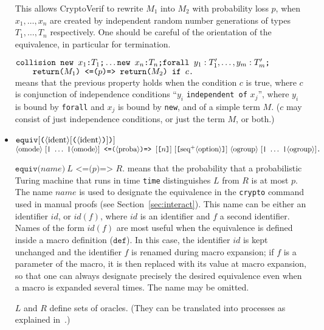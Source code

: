 \begin{itemize}
This allows CryptoVerif to rewrite $M_1$ into $M_2$ with probability
loss $p$, when $x_1, \ldots, x_n$ are created by independent random
number generations of types $T_1, \ldots, T_n$ respectively. One
should be careful of the orientation of the equivalence, in particular
for termination.

$\texttt{collision }\texttt{new\ }{x_1}\texttt{:}{T_1}\texttt{;}\ldots 
\texttt{new\ }{x_n}\texttt{:}{T_n}\texttt{;}
\texttt{forall }y_1:T'_1, \ldots, y_m:T'_m\texttt{;}$\\
$\null\qquad \texttt{return(}M_1\texttt{) <=(}p\texttt{)=> return(}M_2\texttt{) if $c$.}$\\
means that the previous property holds when the condition $c$ is true, where
$c$ is conjunction of independence conditions ``$y_i$ \texttt{independent of} $x_j$'',
where $y_i$ is bound by  \texttt{forall} and $x_j$ is bound by \texttt{new},
and of a simple term $M$. ($c$ may consist of just independence conditions, or just the term $M$, or both.)

\ifchannels
\item $\texttt{equiv}[\texttt{(}\langle\textrm{ident}\rangle[\texttt{(}\langle\textrm{ident}\rangle\texttt{)}]\texttt{)}]$\\
$\nonterm{omode}\ [\texttt{|}\ \ldots\ \texttt{|}\nonterm{omode}]\texttt{ <=(}\nonterm{proba}\texttt{)=> }
[\texttt{[}n\texttt{]}]\ [\texttt{[}\neseq{option}\texttt{]}]\ \nonterm{ogroup}\ [\texttt{|}\ \ldots\ \texttt{|}\nonterm{ogroup}]\texttt{.}$

$\texttt{equiv(}\mathit{name}\texttt{)}\ L\texttt{ <=(}p\texttt{)=> }R\texttt{.}$ means that the
probability that a probabilistic Turing machine that runs in time
{\tt time} distinguishes $L$ from $R$ is at most $p$. The name $\mathit{name}$
is used to designate the equivalence in the \texttt{crypto} command used in manual proofs (see Section~\ref{sec:interact}). This name can be either an identifier $\mathit{id}$, or $\mathit{id}(f)$, where $\mathit{id}$ is an identifier and $f$ a second identifier. Names of the form $\mathit{id}(f)$ are most useful when the equivalence is defined inside a macro definition ($\texttt{def}$). In this case, the identifier $\mathit{id}$ is kept unchanged and the identifier $f$ is renamed during macro expansion; if $f$ is a parameter of the macro, it is then replaced with its value at macro expansion, so that one can always designate precisely the desired equivalence even when a macro is expanded several times.
The name may be omitted.

$L$ and $R$ define sets of oracles. (They can be translated into
processes as explained in~\cite{BlanchetEPrint05}.)
\begin{itemize}


\end{itemize}
\end{itemize}
